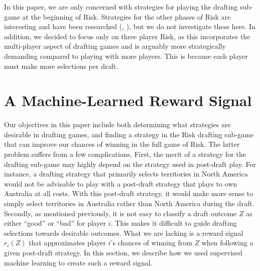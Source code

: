 \documentclass[letterpaper]{article}
\numberwithin{equation}{section}
\numberwithin{theorem}{section}
\numberwithin{lemma}{section}
\numberwithin{df}{section}
\begin{document}
In this paper, we are only concerned with strategies for playing the drafting sub-game at the beginning of Risk.  Strategies for the other phases of Risk are interesting and have been researched (\cite{RiskBots}, \cite{ZuckFelnerKraus2009}), but we do not investigate these here.  In addition, we decided to focus only on three player Risk, as this incorporates the multi-player aspect of drafting games and is arguably more strategically demanding compared to playing with more players.  This is because each player must make more selections per draft.

\section{A Machine-Learned Reward Signal}

Our objectives in this paper include both determining what strategies are desirable in drafting games, and finding a strategy in the Risk drafting sub-game that can improve our chances of winning in the full game of Risk.  The latter problem suffers from a few complications.  First, the merit of a strategy for the drafting sub-game may highly depend on the strategy used in post-draft play.  For instance, a drafting strategy that primarily selects territories in North America would not be advisable to play with a post-draft strategy that plays to own Australia at all costs.  With this post-draft strategy, it would make more sense to simply select territories in Australia rather than North America during the draft.  Secondly, as mentioned previously, it is not easy to classify a draft outcome $Z$ as either ``good'' or ``bad'' for player $i$.  This makes it difficult to guide drafting selections towards desirable outcomes.  What we are lacking is a reward signal $r_i(Z)$ that approximates player $i$'s chances of winning from $Z$ when following a given post-draft strategy.  In this section, we describe how we used supervised machine learning to create such a reward signal.
\end{document}
